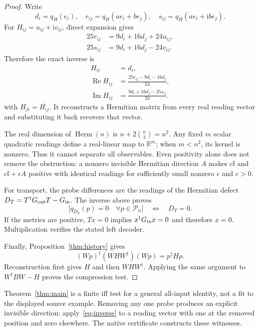 \documentclass[11pt,a4paper]{article}
\newcommand{\adj}{\dagger}
\newcommand{\ii}{\mathrm{i}}
\newcommand{\Id}{\mathbb I}
\newcommand{\Herm}{\operatorname{Herm}}
\newcommand{\qform}[2]{q_{#1}(#2)}
\begin{document}
\begin{proof}
Write
\[
d_i=\qform{H}{e_i},\quad
r_{ij}=\qform{H}{ae_i+be_j},\quad
s_{ij}=\qform{H}{ae_i+\ii be_j}.
\]
For $H_{ij}=u_{ij}+\ii v_{ij}$, direct expansion gives
\begin{align}
25r_{ij}&=9d_i+16d_j+24u_{ij},\\
25s_{ij}&=9d_i+16d_j-24v_{ij}.
\end{align}
Therefore the exact inverse is
\begin{equation}\label{eq:inverse}
\begin{aligned}
H_{ii}&=d_i,\\
\operatorname{Re}H_{ij}&=\frac{25r_{ij}-9d_i-16d_j}{24},\\
\operatorname{Im}H_{ij}&=\frac{9d_i+16d_j-25s_{ij}}{24}.
\end{aligned}
\end{equation}
with $H_{ji}=\overline{H_{ij}}$. It reconstructs a Hermitian matrix from
every real reading vector and substituting it back recovers that vector.

The real dimension of $\Herm(n)$ is $n+2\binom n2=n^2$. Any fixed $m$
scalar quadratic readings define a real-linear map to $\mathbb R^m$;
when $m<n^2$, its kernel is nonzero. Thus it cannot separate all observables.
Even positivity alone does not remove the obstruction: a nonzero invisible
Hermitian direction $A$ makes $c\Id$ and $c\Id+\epsilon A$ positive with
identical readings for sufficiently small nonzero $\epsilon$ and $c>0$.

For transport, the probe differences are the readings of the Hermitian
defect $D_T=T^\adj G_{\rm out}T-G_{\rm in}$. The inverse above proves
\begin{equation}\label{eq:iff}
\bigl[\qform{D_T}{p}=0\quad\forall p\in\mathcal P_n\bigr]
\quad\Longleftrightarrow\quad D_T=0.
\end{equation}
If the metrics are positive, $Tx=0$ implies $x^\adj G_{\rm in}x=0$ and
therefore $x=0$. Multiplication verifies the stated left decoder.

Finally, Proposition~\ref{thm:history} gives
\[
(Wp)^\adj(WHW^\adj)(Wp)=p^\adj Hp.
\]
Reconstruction first gives $H$ and then $WHW^\adj$. Applying the same
argument to $W^\adj BW-H$ proves the compression test.
\end{proof}

Theorem~\ref{thm:main} is a finite iff test for a general all-input identity,
not a fit to the displayed source example. Removing any one probe produces
an explicit invisible direction: apply~\eqref{eq:inverse} to a reading
vector with one at the removed position and zero elsewhere. The native
certificate constructs these witnesses.
\end{document}
